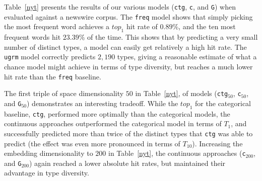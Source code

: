 \documentclass[11pt,a4paper]{article}
\begin{document}
Table~\ref{nyt} presents the results of our various models ({\tt ctg}, \texttt{c}, and \texttt{G}) when evaluated against a newswire corpus. 
The \texttt{freq} model shows that simply picking the most frequent word achieves a $top_{1}$ hit rate of $0.89\%$, and the ten most frequent words hit $23.39\%$ of the time. 
This shows that by predicting a very small number of distinct types, a model can easily get relatively a high hit rate. 
The \texttt{ugrm} model correctly predicts $2,190$ types, giving a reasonable estimate of what a chance model might achieve in terms of type diversity, but reaches a much lower hit rate than the \texttt{freq} baseline. 


The first triple of space dimensionality $50$ in Table~\ref{nyt}, of models ({\tt ctg}$_{50}$, {\tt c}$_{50}$, and {\tt G}$_{50}$) demonstrates an interesting tradeoff.
While the $top_{1}$ for the categorical baseline, {\tt ctg}, performed more optimally than the categorical models, the continuous approaches outperformed the categorical model in terms of $T_{1}$, and successfully predicted more than twice of the distinct types that {\tt ctg} was able to predict (the effect was even more pronounced in terms of $T_{10}$).
Increasing the embedding dimensionality to $200$ in Table~\ref{nyt}, the continuous approaches ({\tt c}$_{200}$, and {\tt G}$_{200}$) again reached a lower absolute hit rates, but maintained their advantage in type diversity. 
\end{document}
